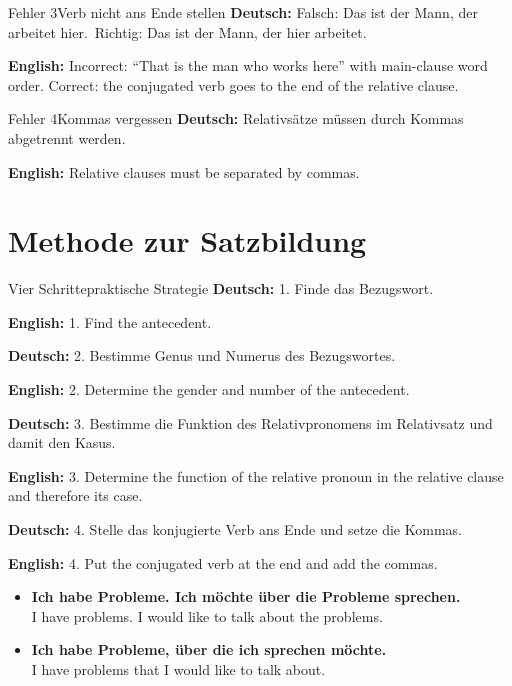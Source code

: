 \documentclass[a4paper,11pt]{article}
\newcommand{\GermanText}[1]{\textbf{Deutsch: }#1\par}
\newcommand{\EnglishText}[1]{{\small\color{SoftGray}\textbf{English: }#1\par}}
\newcommand{\ExampleItem}[2]{\item \textbf{#1}\\{\small\color{SoftGray}#2}}
\begin{document}
        \begin{grammarentry}{Fehler 3}{Verb nicht ans Ende stellen}
            \GermanText{Falsch: \glqq Das ist der Mann, der arbeitet hier.\grqq\ Richtig: \glqq Das ist der Mann, der hier arbeitet.\grqq}
            \EnglishText{Incorrect: ``That is the man who works here'' with main-clause word order. Correct: the conjugated verb goes to the end of the relative clause.}
        \end{grammarentry}

        \begin{grammarentry}{Fehler 4}{Kommas vergessen}
            \GermanText{Relativsätze müssen durch Kommas abgetrennt werden.}
            \EnglishText{Relative clauses must be separated by commas.}
        \end{grammarentry}

    \section{Methode zur Satzbildung}

        \begin{grammarentry}{Vier Schritte}{praktische Strategie}
            \GermanText{1. Finde das Bezugswort.}
            \EnglishText{1. Find the antecedent.}

            \GermanText{2. Bestimme Genus und Numerus des Bezugswortes.}
            \EnglishText{2. Determine the gender and number of the antecedent.}

            \GermanText{3. Bestimme die Funktion des Relativpronomens im Relativsatz und damit den Kasus.}
            \EnglishText{3. Determine the function of the relative pronoun in the relative clause and therefore its case.}

            \GermanText{4. Stelle das konjugierte Verb ans Ende und setze die Kommas.}
            \EnglishText{4. Put the conjugated verb at the end and add the commas.}
        \end{grammarentry}

        \begin{exbox}
            \begin{itemize}
                \ExampleItem{Ich habe Probleme. Ich möchte über die Probleme sprechen.}{I have problems. I would like to talk about the problems.}
                \ExampleItem{Ich habe Probleme, über die ich sprechen möchte.}{I have problems that I would like to talk about.}
            \end{itemize}
        \end{exbox}
\end{document}
